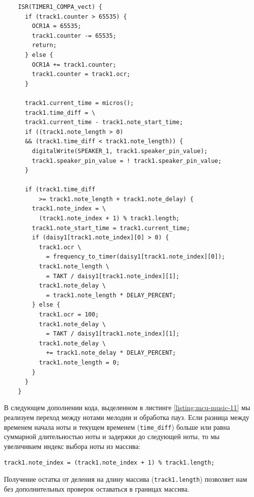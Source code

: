 \documentclass[../sparc.tex]{subfiles}
\begin{document}
\begin{listing}[H]
  \begin{verbatim}
    ISR(TIMER1_COMPA_vect) {
      if (track1.counter > 65535) {
        OCR1A = 65535;
        track1.counter -= 65535;
        return;
      } else {
        OCR1A += track1.counter;
        track1.counter = track1.ocr;
      }

      track1.current_time = micros();
      track1.time_diff = \
      track1.current_time - track1.note_start_time;
      if ((track1.note_length > 0)
      && (track1.time_diff < track1.note_length)) {
        digitalWrite(SPEAKER_1, track1.speaker_pin_value);
        track1.speaker_pin_value = ! track1.speaker_pin_value;
      }

      if (track1.time_diff
          >= track1.note_length + track1.note_delay) {
        track1.note_index = \
          (track1.note_index + 1) % track1.length;
        track1.note_start_time = track1.current_time;
        if (daisy1[track1.note_index][0] > 0) {
          track1.ocr \
            = frequency_to_timer(daisy1[track1.note_index][0]);
          track1.note_length \
            = TAKT / daisy1[track1.note_index][1];
          track1.note_delay \
            = track1.note_length * DELAY_PERCENT;
        } else {
          track1.ocr = 100;
          track1.note_delay \
            = TAKT / daisy1[track1.note_index][1];
          track1.note_delay \
            += track1.note_delay * DELAY_PERCENT;
          track1.note_length = 0;
        }
      }
    }
  \end{verbatim}
  \caption{Переход между нотами и реализация пауз.}
  \label{listing:mcu-music-11}
\end{listing}

В следующем дополнении кода, выделенном в листинге \ref{listing:mcu-music-11} мы
реализуем переход между нотами мелодии и обработка пауз.  Если разница между
временем начала ноты и текущем временем (\texttt{time_diff}) больше или
равна суммарной длительностью ноты и задержки до следующей ноты, то мы
увеличиваем индекс выбора ноты из массива:

\begin{verbatim}
track1.note_index = (track1.note_index + 1) % track1.length;
\end{verbatim}

Получение остатка от деления на длину массива (\texttt{track1.length})
позволяет нам без дополнительных проверок оставаться в границах массива.
\end{document}
